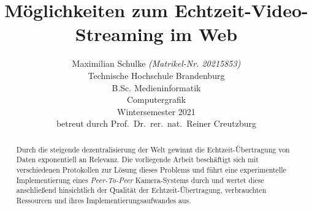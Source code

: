 \documentclass{article}
\title{Möglichkeiten zum Echtzeit-Video-Streaming im Web}
\author{
	\vspace{0.5em}
	Maximilian Schulke \textit{(Matrikel-Nr. 20215853)}\\
	\small{Technische Hochschule Brandenburg}\\
	\small{B.Sc. Medieninformatik}\\
	\small{Computergrafik}\\
	\small{Wintersemester 2021}\\
	\small{betreut durch Prof.\ Dr.\ rer.\ nat.\ Reiner Creutzburg}\\
}
\begin{document}
\begin{onecolumn}
	\begin{titlepage}


		\maketitle

		\begin{abstract}
			Durch die steigende dezentralisierung der Welt gewinnt die
			Echtzeit-Übertragung von Daten exponentiell an Relevanz. Die
			vorliegende Arbeit beschäftigt sich mit verschiedenen Protokollen
			zur Lösung dieses Problems und führt eine experimentelle
			Implementierung eines \textit{Peer-To-Peer} Kamera-Systems durch
			und wertet diese anschließend hinsichtlich der Qualität der
			Echtzeit-Übertragung, verbrauchten Ressourcen und ihres
			Implementierungsaufwandes aus.
		\end{abstract}

		\tableofcontents

		\listoffigures
		\listoftables
	\end{titlepage}
\end{onecolumn}

\end{document}
